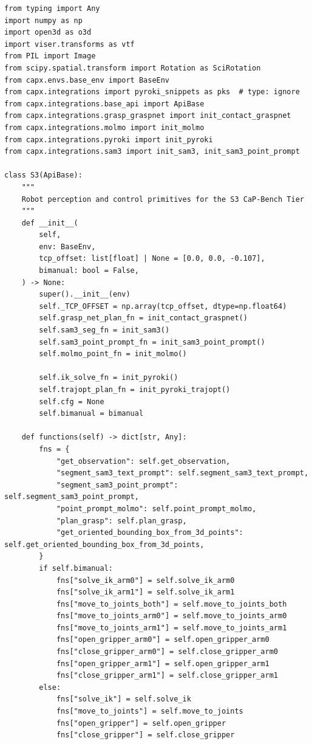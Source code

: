 \begin{lstlisting}
from typing import Any
import numpy as np
import open3d as o3d
import viser.transforms as vtf
from PIL import Image
from scipy.spatial.transform import Rotation as SciRotation
from capx.envs.base_env import BaseEnv
from capx.integrations import pyroki_snippets as pks  # type: ignore
from capx.integrations.base_api import ApiBase
from capx.integrations.grasp_graspnet import init_contact_graspnet
from capx.integrations.molmo import init_molmo
from capx.integrations.pyroki import init_pyroki
from capx.integrations.sam3 import init_sam3, init_sam3_point_prompt

class S3(ApiBase):
    """
    Robot perception and control primitives for the S3 CaP-Bench Tier
    """
    def __init__(
        self,
        env: BaseEnv,
        tcp_offset: list[float] | None = [0.0, 0.0, -0.107],
        bimanual: bool = False,
    ) -> None:
        super().__init__(env)
        self._TCP_OFFSET = np.array(tcp_offset, dtype=np.float64)
        self.grasp_net_plan_fn = init_contact_graspnet()  
        self.sam3_seg_fn = init_sam3()
        self.sam3_point_prompt_fn = init_sam3_point_prompt()
        self.molmo_point_fn = init_molmo()

        self.ik_solve_fn = init_pyroki()
        self.trajopt_plan_fn = init_pyroki_trajopt()
        self.cfg = None
        self.bimanual = bimanual

    def functions(self) -> dict[str, Any]:
        fns = {
            "get_observation": self.get_observation,
            "segment_sam3_text_prompt": self.segment_sam3_text_prompt,
            "segment_sam3_point_prompt": self.segment_sam3_point_prompt,
            "point_prompt_molmo": self.point_prompt_molmo,
            "plan_grasp": self.plan_grasp,
            "get_oriented_bounding_box_from_3d_points": self.get_oriented_bounding_box_from_3d_points,
        }
        if self.bimanual:
            fns["solve_ik_arm0"] = self.solve_ik_arm0
            fns["solve_ik_arm1"] = self.solve_ik_arm1
            fns["move_to_joints_both"] = self.move_to_joints_both
            fns["move_to_joints_arm0"] = self.move_to_joints_arm0
            fns["move_to_joints_arm1"] = self.move_to_joints_arm1
            fns["open_gripper_arm0"] = self.open_gripper_arm0
            fns["close_gripper_arm0"] = self.close_gripper_arm0
            fns["open_gripper_arm1"] = self.open_gripper_arm1
            fns["close_gripper_arm1"] = self.close_gripper_arm1
        else:
            fns["solve_ik"] = self.solve_ik
            fns["move_to_joints"] = self.move_to_joints
            fns["open_gripper"] = self.open_gripper
            fns["close_gripper"] = self.close_gripper


\end{lstlisting}
